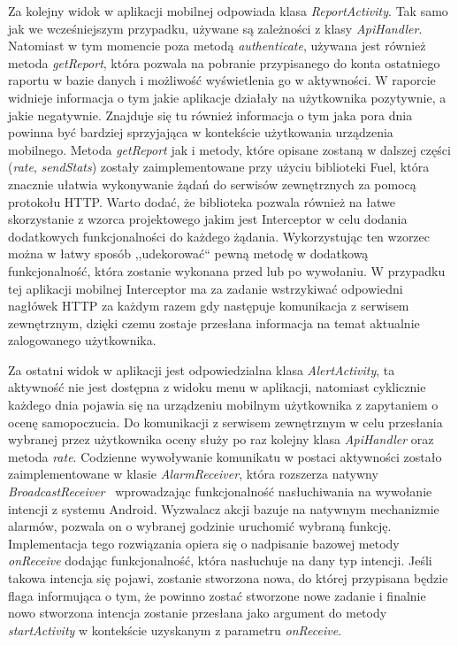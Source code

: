 \documentclass[a4paper,twoside,12pt]{book}
\begin{document}
Za kolejny widok w aplikacji mobilnej odpowiada klasa \textit{ReportActivity}. Tak samo jak we wcześniejszym przypadku, używane są zależności z klasy \textit{ApiHandler}. Natomiast w tym momencie poza metodą \textit{authenticate}, używana jest również metoda \textit{getReport}, która pozwala na pobranie przypisanego do konta ostatniego raportu w bazie danych i możliwość wyświetlenia go w aktywności. W raporcie widnieje informacja o tym jakie aplikacje działały na użytkownika pozytywnie, a jakie negatywnie. Znajduje się tu również informacja o tym jaka pora dnia powinna być bardziej sprzyjająca w kontekście użytkowania urządzenia mobilnego. Metoda \textit{getReport} jak i metody, które opisane zostaną w dalszej części (\textit{rate}, \textit{sendStats}) zostały zaimplementowane przy użyciu biblioteki Fuel, która znacznie ułatwia wykonywanie żądań do serwisów zewnętrznych za pomocą protokołu HTTP. Warto dodać, że biblioteka pozwala również na łatwe skorzystanie z wzorca projektowego jakim jest Interceptor w celu dodania dodatkowych funkcjonalności do każdego żądania. Wykorzystując ten wzorzec można w łatwy sposób ,,udekorować`` pewną metodę w dodatkową funkcjonalność, która zostanie wykonana przed lub po wywołaniu. W przypadku tej aplikacji mobilnej Interceptor ma za zadanie wstrzykiwać odpowiedni nagłówek HTTP za każdym razem gdy następuje komunikacja z serwisem zewnętrznym, dzięki czemu zostaje przesłana informacja na temat aktualnie zalogowanego użytkownika. 

Za ostatni widok w aplikacji jest odpowiedzialna klasa \textit{AlertActivity}, ta aktywność nie jest dostępna z widoku menu w aplikacji, natomiast cyklicznie każdego dnia pojawia się na urządzeniu mobilnym użytkownika z zapytaniem o ocenę samopoczucia. Do komunikacji z serwisem zewnętrznym w celu przesłania wybranej przez użytkownika oceny służy po raz kolejny klasa \textit{ApiHandler} oraz metoda \textit{rate}. Codzienne wywoływanie komunikatu w postaci aktywności zostało zaimplementowane w klasie \textit{AlarmReceiver}, która rozszerza natywny \textit{BroadcastReceiver}~\cite{alarm_api} wprowadzając funkcjonalność nasłuchiwania na wywołanie intencji z systemu Android. Wyzwalacz akcji bazuje na natywnym mechanizmie alarmów,  pozwala on  o wybranej godzinie uruchomić wybraną funkcję. Implementacja tego rozwiązania opiera się o nadpisanie bazowej metody \textit{onReceive} dodając funkcjonalność, która nasłuchuje na dany typ intencji. Jeśli takowa intencja się pojawi, zostanie stworzona nowa, do której przypisana będzie flaga informująca o tym, że powinno zostać stworzone nowe zadanie i finalnie nowo stworzona intencja zostanie przesłana jako argument do metody \textit{startActivity} w kontekście uzyskanym z parametru \textit{onReceive}. 
\end{document}

